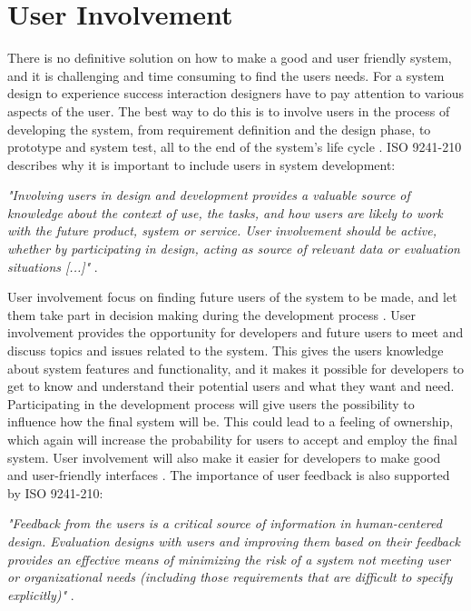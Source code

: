 \section{User Involvement}
\label{sec:userinvolvement}
There is no definitive solution on how to make a good and user friendly system, and it is challenging and time consuming to find the users needs. For a system design to experience success interaction designers have to pay attention to various aspects of the user. The best way to do this is to involve users in the process of developing the system, from requirement definition and the design phase, to prototype and system test, all to the end of the system's life cycle \cite{mmi}. ISO 9241-210 describes why it is important to include users in system development:

\emph{"Involving users in design and development provides a valuable source of knowledge about the context of use, the tasks, and how users are likely to work with the future product, system or service. User involvement should be active, whether by participating in design, acting as source of relevant data or evaluation situations [...]"} \cite{dis20109241}.

User involvement focus on finding future users of the system to be made, and let them take part in decision making during the development process \cite{bjerknes1995user}. User involvement provides the opportunity for developers and future users to meet and discuss topics and issues related to the system. This gives the users knowledge about system features and functionality, and it makes it possible for developers to get to know and understand their potential users and what they want and need. Participating in the development process will give users the possibility to influence how the final system will be. This could lead to a feeling of ownership, which again will increase the probability for users to accept and employ the final system. User involvement will also make it easier for developers to make good and user-friendly interfaces \cite{infodesign} \cite{mmi}. The importance of user feedback is also supported by ISO 9241-210:

\emph{"Feedback from the users is a critical source of information in human-centered design. Evaluation designs with users and improving them based on their feedback provides an effective means of minimizing the risk of a system not meeting user or organizational needs (including those requirements that are difficult to specify explicitly)"} \cite{dis20109241}.


